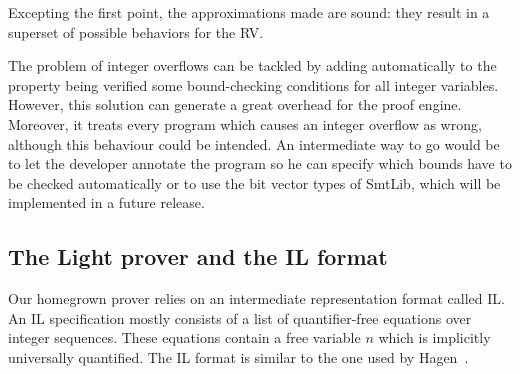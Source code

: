Excepting the first point, the approximations made are sound: they result in a superset of possible behaviors for the RV. %

The problem of integer overflows can be tackled by adding automatically to the property being verified some bound-checking conditions for all integer variables. However, this solution can generate a great overhead for the proof engine. Moreover, it treats every program which causes an integer overflow as wrong, although this behaviour could be intended. An intermediate way to go would be to let the developer annotate the program so he can specify which bounds have to be checked automatically or to use the bit vector types of SmtLib, which will be implemented in a future release.

%




\subsection{The Light prover and the IL format} 

Our homegrown prover relies on an intermediate representation format called
{IL}. An IL specification mostly consists of a list of quantifier-free equations
over integer sequences. These equations contain a free variable $n$ which is
implicitly universally quantified. The IL format is similar to the one used by Hagen~\cite{HagenPhD}.


